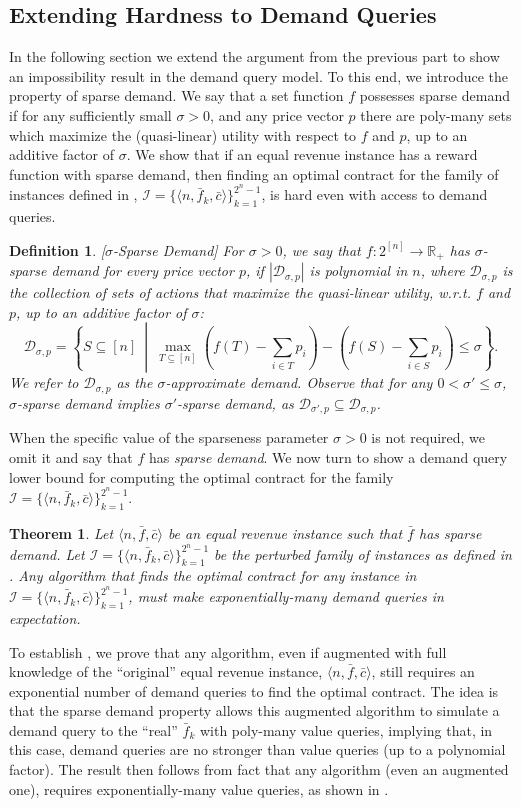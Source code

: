 \documentclass[11pt]{article}
\newtheorem{theorem}{Theorem}
\newtheorem{definition}{Definition}
\newcommand{\reals}{\mathbb{R}}
\newcommand{\I}{\mathcal{I}}
\newcommand{\feq}{\bar{f}}
\newcommand{\ceq}{\bar{c}}
\newcommand{\demand}[2]{\mathcal{D}_{{#1},{#2}}}
\newcommand{\demSigP}{\demand{\sigma}{p}}
\newcommand{\eqRevInst}{\langle n,\feq,\ceq \rangle}
\newcommand{\perturbedInst}{\langle n,\feq_k,\ceq \rangle}
\newcommand{\familyI}{\I = \{ \perturbedInst \}_{k=1}^{2^n-1}}
\begin{document}
\subsection{Extending Hardness to Demand Queries}\label{sec:SparsetoDemand}
In the following section we extend the argument from the previous part to show an impossibility result in the demand query model.
To this end, we introduce the property of sparse demand. We say that a set function $f$ possesses sparse demand if for any sufficiently small $\sigma>0$, and any price vector $p$ there are poly-many sets which maximize the (quasi-linear) utility with respect to $f$ and $p$, up to an additive factor of $\sigma$.
We show that if an equal revenue instance has a reward function with sparse demand, then finding an optimal contract for the family of instances defined in , $\familyI$, is hard even with access to demand queries.

\begin{definition}\label{def:sparseDemand}[$\sigma$-Sparse Demand]
For $\sigma >0$, we say that $f: 2^{[n]} \rightarrow \reals_+$ has $\sigma$-sparse demand for every price vector $p$, if $|\demSigP|$ is polynomial in $n$, where $\demSigP$ is the collection of sets of actions that maximize the quasi-linear utility, w.r.t. $f$ and $p$, up to an additive factor of $\sigma$:
$$
\demSigP = \left\{ S\subseteq [n] ~\middle|~ \max_{T\subseteq [n]} \left(f(T)-\sum_{i\in T} p_i\right) - \left(f(S) - \sum_{i\in S} p_i\right) \le \sigma \right\}.
$$
We refer to $\demSigP$ as the $\sigma$-approximate demand. 
Observe that for any $0 < \sigma' \le \sigma$, $\sigma$-sparse demand implies $\sigma'$-sparse demand, as $\demand{\sigma'}{p} \subseteq \demSigP$.
\end{definition}
When the specific value of the sparseness parameter $\sigma>0$ is not required, we omit it and say that $f$ has \textit{sparse demand}.
We now turn to show a demand query lower bound for computing the optimal contract for the family $\familyI$.
\begin{theorem}\label{thm:DemandHardnessForPerturbed}
    Let $\eqRevInst$ be an equal revenue instance such that $\feq$ has sparse demand. Let $\familyI$ be the perturbed family of instances as defined in .
    Any algorithm that finds the optimal contract for any instance in $\familyI$, must make  exponentially-many demand queries in expectation.
\end{theorem}

To establish , we prove that any algorithm, even if augmented with full knowledge of the ``original'' equal revenue instance, $\eqRevInst$, still requires an exponential number of demand queries to find the optimal contract.
The idea is that the sparse demand property allows this augmented algorithm to simulate a demand query to the ``real'' $\feq_k$ with poly-many value queries, implying that, in this case, demand queries are no stronger than value queries (up to a polynomial factor).
The result then follows from fact that any algorithm (even an augmented one), requires exponentially-many value queries, as shown in .
\end{document}

